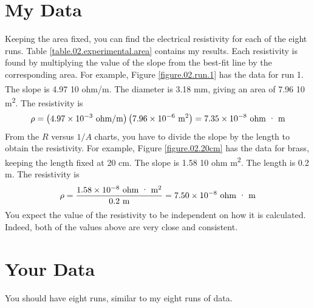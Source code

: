 \section{My Data}
%
Keeping the area fixed, you can find the electrical resistivity for each of the eight runs. Table \ref{table.02.experimental.area} contains my results. Each resistivity is found by multiplying the value of the slope from the best-fit line by the corresponding area. For example, Figure \ref{figure.02.run.1} has the data for run 1. The slope is 4.97{ }\texttimes{ }10\textsuperscript{} ohm/m. The diameter is 3.18 mm, giving an area of 7.96{ }\texttimes{ }10\textsuperscript{} m\textsuperscript{2}. The resistivity is
\begin{equation}
	\rho = \left(4.97 \times 10^{-3} \ \text{ohm/m}\right) \left(7.96 \times 10^{-6} \ \text{m}^{2}\right) = 7.35 \times 10^{-8} \ \text{ohm{ }\textperiodcentered{ }m}
\end{equation}
From the $R$ versus $1/A$ charts, you have to divide the slope by the length to obtain the resistivity. For example, Figure \ref{figure.02.20cm} has the data for brass, keeping the length fixed at 20 cm. The slope is 1.58{ }\texttimes{ }10\textsuperscript{} ohm{ }\textperiodcentered{ }m\textsuperscript{2}. The length is 0.2 m. The resistivity is
\begin{equation}
	\rho = \frac{1.58 \times 10^{-8} \ \text{ohm{ }\textperiodcentered{ }m\textsuperscript{2}}}{0.2 \ \text{m}} = 7.50 \times 10^{-8} \ \text{ohm{ }\textperiodcentered{ }m}
\end{equation}
You expect the value of the resistivity to be independent on how it is calculated. Indeed, both of the values above are very close and consistent.
%
\section{Your Data}
%
You should have eight runs, similar to my eight runs of data.
%
\newpage
